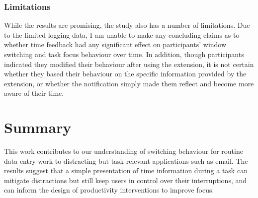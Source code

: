 \subsubsection{Limitations}
While the results are promising, the study also has a number of limitations. Due to the limited logging data, I am unable to make any concluding claims as to whether time feedback had any significant effect on participants’ window switching and task focus behaviour over time. In addition, though participants indicated they modified their behaviour after using the extension, it is not certain whether they based their behaviour on the specific information provided by the extension, or whether the notification simply made them reflect and become more aware of their time. 

\section{Summary}
This work contributes to our understanding of switching behaviour for routine data entry work to distracting but task-relevant applications such as email. The results suggest that a simple presentation of time information during a task can mitigate distractions but still keep users in control over their interruptions, and can inform the design of productivity interventions to improve focus. 